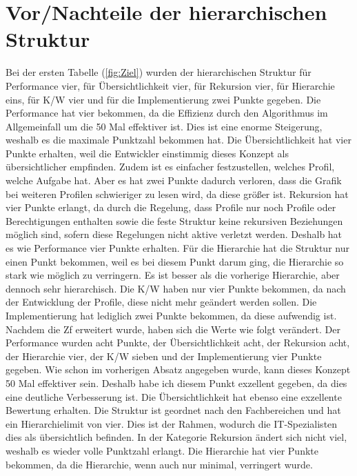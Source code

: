 \section{Vor/Nachteile der hierarchischen Struktur}
\label{sec:chapter05:Hierarchische}
Bei der ersten Tabelle (\ref{fig:Ziel}) wurden der hierarchischen Struktur für Performance vier, für Übersichtlichkeit vier, für Rekursion vier, für Hierarchie eins, für \ac{K/W} vier und für die Implementierung zwei Punkte gegeben.
Die Performance hat vier bekommen, da die Effizienz durch den Algorithmus im Allgemeinfall um die 50 Mal effektiver ist.
Dies ist eine enorme Steigerung, weshalb es die maximale Punktzahl bekommen hat.
Die Übersichtlichkeit hat vier Punkte erhalten, weil die Entwickler einstimmig dieses Konzept als übersichtlicher empfinden.
Zudem ist es einfacher festzustellen, welches Profil, welche Aufgabe hat.
Aber es hat zwei Punkte dadurch verloren, dass die Grafik bei weiteren Profilen schwieriger zu lesen wird, da diese größer ist.
Rekursion hat vier Punkte erlangt, da durch die Regelung, dass Profile nur noch Profile oder Berechtigungen enthalten sowie die feste Struktur keine rekursiven Beziehungen möglich sind, sofern diese Regelungen nicht aktive verletzt werden.
Deshalb hat es wie Performance vier Punkte erhalten.
Für die Hierarchie hat die Struktur nur einen Punkt bekommen, weil es bei diesem Punkt darum ging, die Hierarchie so stark wie möglich zu verringern.
Es ist besser als die vorherige Hierarchie, aber dennoch sehr hierarchisch.
Die \ac{K/W} haben nur vier Punkte bekommen, da nach der Entwicklung der Profile, diese nicht mehr geändert werden sollen.
Die Implementierung hat lediglich zwei Punkte bekommen, da diese aufwendig ist.
\newline
\newline
Nachdem die \ac{Zf} erweitert wurde, haben sich die Werte wie folgt verändert.
Der Performance wurden acht Punkte, der Übersichtlichkeit acht, der Rekursion acht, der Hierarchie vier, der \ac{K/W} sieben und der Implementierung vier Punkte gegeben.
Wie schon im vorherigen Absatz angegeben wurde, kann dieses Konzept 50 Mal effektiver sein.
Deshalb habe ich diesem Punkt exzellent gegeben, da dies eine deutliche Verbesserung ist.
Die Übersichtlichkeit hat ebenso eine exzellente Bewertung erhalten.
Die Struktur ist geordnet nach den Fachbereichen und hat ein Hierarchielimit von vier.
Dies ist der Rahmen, wodurch die IT-Spezialisten dies als übersichtlich befinden.
In der Kategorie Rekursion ändert sich nicht viel, weshalb es wieder volle Punktzahl erlangt.
Die Hierarchie hat vier Punkte bekommen, da die Hierarchie, wenn auch nur minimal, verringert wurde.

